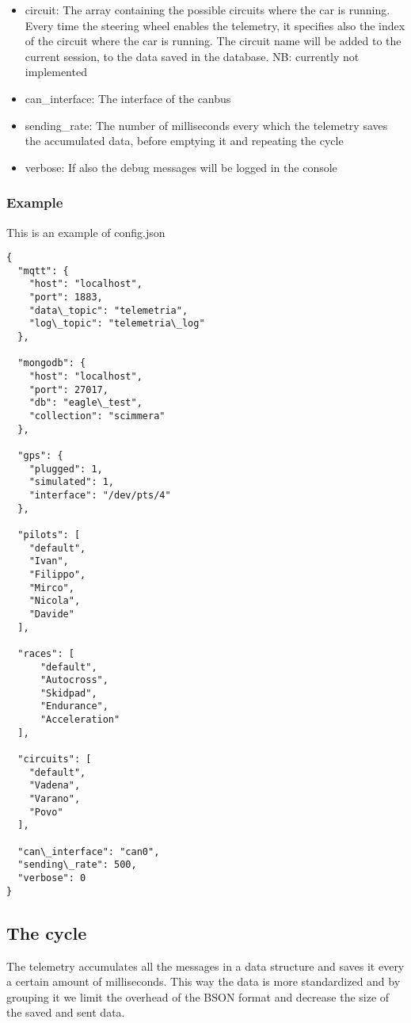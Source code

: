\begin{itemize}
    \item circuit: The array containing the possible circuits where the car is running. Every time the steering wheel enables the telemetry, it specifies also the index of the circuit where the car is running. The circuit name will be added to the current session, to the data saved in the database. NB: currently not implemented
    \item can\_interface: The interface of the canbus
    \item sending\_rate: The number of milliseconds every which the telemetry saves the accumulated data, before emptying it and repeating the cycle
    \item verbose: If also the debug messages will be logged in the console
\end{itemize}

\subsubsection{Example}

This is an example of config.json

\begin{verbatim}
{
  "mqtt": {
    "host": "localhost",
    "port": 1883,
    "data\_topic": "telemetria",
    "log\_topic": "telemetria\_log"
  },

  "mongodb": {
    "host": "localhost",
    "port": 27017,
    "db": "eagle\_test",
    "collection": "scimmera"
  },

  "gps": {
    "plugged": 1,
    "simulated": 1,
    "interface": "/dev/pts/4"
  },

  "pilots": [
    "default",
    "Ivan",
    "Filippo",
    "Mirco",
    "Nicola",
    "Davide"
  ],

  "races": [
      "default",
      "Autocross",
      "Skidpad",
      "Endurance",
      "Acceleration"
  ],

  "circuits": [
    "default",
    "Vadena",
    "Varano",
    "Povo"
  ],

  "can\_interface": "can0",
  "sending\_rate": 500,
  "verbose": 0
}
\end{verbatim}

\subsection{The cycle}

The telemetry accumulates all the messages in a data structure and saves it every a certain amount of milliseconds. This way the data is more
standardized and by grouping it we limit the overhead of the BSON format and decrease the size of the saved and sent data.

